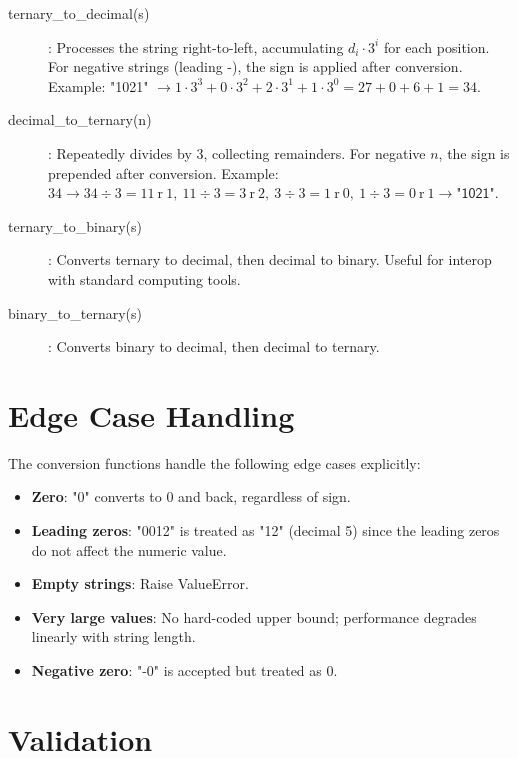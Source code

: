 \documentclass[12pt,a4paper,twoside]{book}
\theoremstyle{trinarytheorem}
\theoremstyle{trinarydefinition}
\newcommand{\code}[1]{\textsf{#1}}
\begin{document}
\begin{description}
    \item[\code{ternary\_to\_decimal(s)}]: Processes the string right-to-left,
          accumulating $d_i \cdot 3^i$ for each position. For negative strings (leading
          \code{-}), the sign is applied after conversion.
          \newline Example: \code{"1021"} $\rightarrow 1\cdot3^3 + 0\cdot3^2 + 2\cdot3^1 + 1\cdot3^0 = 27 + 0 + 6 + 1 = 34$.
    \item[\code{decimal\_to\_ternary(n)}]: Repeatedly divides by 3, collecting
          remainders. For negative $n$, the sign is prepended after conversion.
          \newline Example: $34 \rightarrow 34 \div 3 = 11\ \text{r}\ 1,\ 11 \div 3 = 3\ \text{r}\ 2,\ 3 \div 3 = 1\ \text{r}\ 0,\ 1 \div 3 = 0\ \text{r}\ 1 \rightarrow \code{"1021"}$.
    \item[\code{ternary\_to\_binary(s)}]: Converts ternary to decimal, then decimal
          to binary. Useful for interop with standard computing tools.
    \item[\code{binary\_to\_ternary(s)}]: Converts binary to decimal, then decimal
          to ternary.
\end{description}

\section{Edge Case Handling}

The conversion functions handle the following edge cases explicitly:
\begin{itemize}
    \item \textbf{Zero}: \code{"0"} converts to 0 and back, regardless of sign.
    \item \textbf{Leading zeros}: \code{"0012"} is treated as \code{"12"} (decimal 5)
          since the leading zeros do not affect the numeric value.
    \item \textbf{Empty strings}: Raise \code{ValueError}.
    \item \textbf{Very large values}: No hard-coded upper bound; performance degrades
          linearly with string length.
    \item \textbf{Negative zero}: \code{"-0"} is accepted but treated as 0.
\end{itemize}

\section{Validation}
\end{document}
